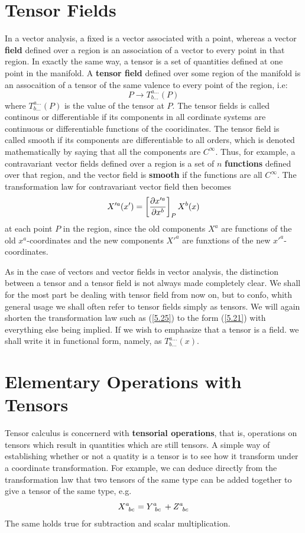 \section{Tensor Fields}\label{sec:5.7}
In a vector analysis, a fixed is a vector associated with a point, whereas a vector \textbf{field} defined over a region is an association of a vector to every point in that region. In exactly the same way, a tensor is a set of quantities defined at one point in the manifold. A \textbf{tensor field} defined over some region of the manifold is an assocaition of a tensor of the same valence to every point of the region, i.e: $$P\to T_{b...}^{a...}(P)$$ where $T_{b...}^{a...}(P)$ is the value of the tensor at $P$. The tensor fields is called continous or differentiable if its components in all cordinate systems are continuous  or differentiable functions of the cooridinates. The tensor field is called smooth if its components are differentiable to all orders, which is denoted mathematically by saying that all the components are $C^\infty$. Thus, for example, a contravariant vector fields defined over a region is a set of $n$ \textbf{functions} defined over that region, and the vector field is \textbf{smooth} if the functions are all $C^\infty$. The transformation law for contravariant vector field then becomes
\begin{equation}\label{5.25}
  X'^{a}(x')=\left[\pdv{x'^{a}}{x^b}\right]_PX^b(x)
\end{equation}
at each point $P$ in the region, since the old components $X^{a}$ are functions of the old $x^{a}$-coordinates and the new components $X'^{a}$ are funxtions of the new $x'^{a}$-coordinates.

As in the case of vectors and vector fields in vector analysis, the distinction between a tensor and a tensor field is not always made completely clear. We shall for the most part be dealing with tensor field from now on, but to confo, whith general usage we shall often refer to tensor fields simply as tensors. We will again shorten the transformation law such as (\ref{5.25}) to the form (\ref{5.21}) with everything else being implied. If we wish to emphasize that a tensor is a field. we shall write it in functional form, namely, as $T_{b...}^{a...}(x)$.

\section{Elementary Operations with Tensors}\label{sec:5.8}
Tensor calculus is concernerd with \textbf{tensorial operations}, that is, operations on tensors which result in quantities which are still tensors. A simple way of establishing whether or not a quatity is a tensor is to see how it transform under a coordinate transformation. For example, we can deduce directly from the transformation law that two tensors of the same type can be added together to give a tensor of the same type, e.g.
\begin{equation}\label{5.26}
  \tensor{X}{^{a}_{bc}} = \tensor{Y}{^{a}_{bc}} + \tensor{Z}{^{a}_{bc}}
\end{equation}
The same holds true for subtraction and scalar multiplication.

